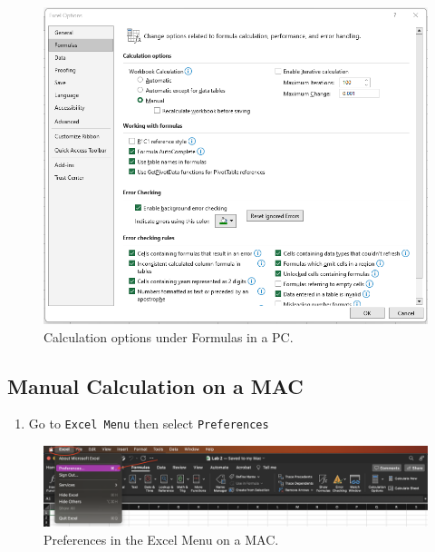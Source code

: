 \documentclass[
  12pt,
  letterpaper,
]{book}
\providecommand{\tightlist}{%
  \setlength{\itemsep}{0pt}\setlength{\parskip}{0pt}}
\begin{document}
\begin{figure}

{\centering \includegraphics[width=0.8\linewidth]{images/manualcalc-pc} 

}

\caption{Calculation options under Formulas in a PC.}\label{fig:manualcalc-pc}
\end{figure}

\hypertarget{manual-calculation-on-a-mac}{%
\subsection{Manual Calculation on a MAC}\label{manual-calculation-on-a-mac}}

\begin{enumerate}
\def\labelenumi{\arabic{enumi}.}
\tightlist
\item
  Go to \texttt{Excel\ Menu} then select \texttt{Preferences}
\end{enumerate}

\begin{figure}

{\centering \includegraphics[width=0.9\linewidth]{images/manual-calculation1} 

}

\caption{Preferences in the Excel Menu on a MAC.}\label{fig:manual-calculation1}
\end{figure}
\end{document}
